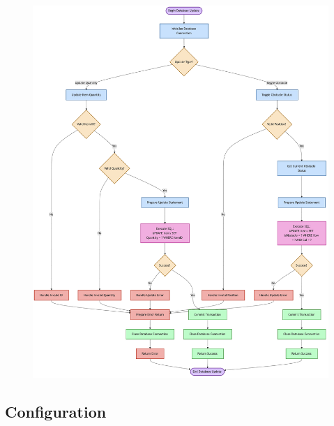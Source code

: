 \begin{figure}[htbp]
    \centering
    \includegraphics[width=0.9\linewidth]{Flowcharts/dbwrite.png}
\end{figure}

\newpage

\subsection{Configuration}

